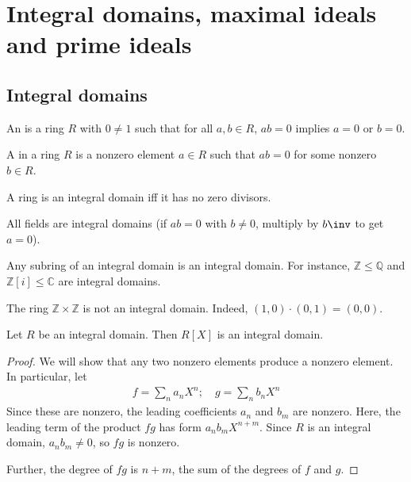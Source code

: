 \section{Integral domains, maximal ideals and prime ideals}
\subsection{Integral domains}
\begin{definition}
	An  is a ring $R$ with $0 \neq 1$ such that for all $a, b \in R$, $a b = 0$ implies $a = 0$ or $b = 0$.
\end{definition}

\begin{definition}
	A  in a ring $R$ is a nonzero element $a \in R$ such that $a b = 0$ for some nonzero $b \in R$.
\end{definition} 

A ring is an integral domain iff it has no zero divisors.

\begin{example}
	All fields are integral domains (if $ab = 0$ with $b \neq 0$, multiply by $b\inv$ to get $a = 0$).
\end{example}

\begin{example}
	Any subring of an integral domain is an integral domain.
	For instance, $\mathbb{Z} \leq \mathbb{Q}$ and $\mathbb Z[i] \leq \mathbb C$ are integral domains.
\end{example} 

\begin{example}
	The ring $\mathbb Z \times \mathbb Z$ is not an integral domain.
	Indeed, $(1,0) \cdot (0,1) = (0,0)$.
\end{example}

\begin{lemma} \label{lem:9.1}
	Let $R$ be an integral domain.
	Then $R[X]$ is an integral domain.
\end{lemma}

\begin{proof}
	We will show that any two nonzero elements produce a nonzero element.
	In particular, let
	\begin{align*}
		f = \sum_n a_n X^n;\quad g = \sum_n b_n X^n
	\end{align*}
	Since these are nonzero, the leading coefficients $a_n$ and $b_m$ are nonzero.
	Here, the leading term of the product $fg$ has form $a_n b_m X^{n+m}$.
	Since $R$ is an integral domain, $a_n b_m \neq 0$, so $fg$ is nonzero.

	Further, the degree of $fg$ is $n + m$, the sum of the degrees of $f$ and $g$.
\end{proof}

